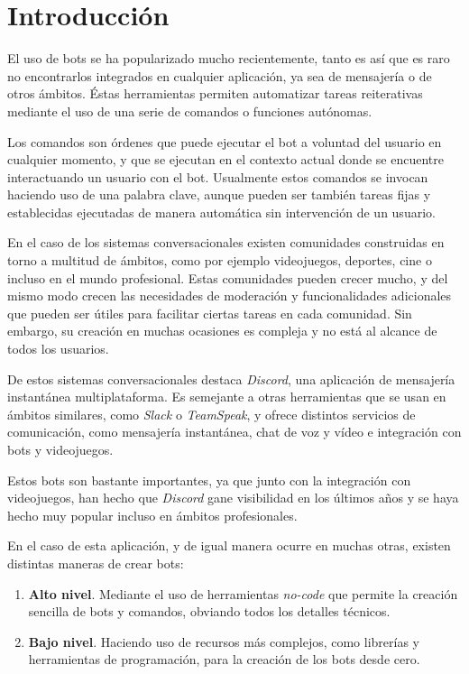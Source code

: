 \chapter{Introducción}

El uso de bots se ha popularizado mucho recientemente, tanto es así que es raro no encontrarlos integrados en cualquier aplicación, ya sea de mensajería o de otros ámbitos. Éstas herramientas permiten automatizar tareas reiterativas mediante el uso de una serie de comandos o funciones autónomas.

Los comandos son órdenes que puede ejecutar el bot a voluntad del usuario en cualquier momento, y que se ejecutan en el contexto actual donde se encuentre interactuando un usuario con el bot. Usualmente estos comandos se invocan haciendo uso de una palabra clave, aunque pueden ser también tareas fijas y establecidas ejecutadas de manera automática sin intervención de un usuario.

En el caso de los sistemas conversacionales existen comunidades construidas en torno a multitud de ámbitos, como por ejemplo videojuegos, deportes, cine o incluso en el mundo profesional. Estas comunidades pueden crecer mucho, y del mismo modo crecen las necesidades de moderación y funcionalidades adicionales que pueden ser útiles para facilitar ciertas tareas en cada comunidad. Sin embargo, su creación en muchas ocasiones es compleja y no está al alcance de todos los usuarios.

De estos sistemas conversacionales destaca \textit{Discord}\cite{earthweb}, una aplicación de mensajería instantánea multiplataforma. Es semejante a otras herramientas que se usan en ámbitos similares, como \textit{Slack} o \textit{TeamSpeak}, y ofrece distintos servicios de comunicación, como mensajería instantánea, chat de voz y vídeo e integración con bots y videojuegos.

Estos bots son bastante importantes, ya que junto con la integración con videojuegos, han hecho que \textit{Discord} gane visibilidad en los últimos años y se haya hecho muy popular incluso en ámbitos profesionales. 

En el caso de esta aplicación, y de igual manera ocurre en muchas otras, existen distintas maneras de crear bots:

\begin{enumerate}
	\item \textbf{Alto nivel}. Mediante el uso de herramientas \textit{no-code} que permite la creación sencilla de bots y comandos, obviando todos los detalles técnicos.
	\item \textbf{Bajo nivel}. Haciendo uso de recursos más complejos, como librerías y herramientas de programación, para la creación de los bots desde cero.
\end{enumerate}


